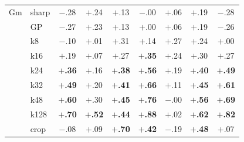 \begin{tabular}{llccccccc}
\midrule
Gm & sharp & $-$.28 & $+$.24 & $+$.13 & $-$.00 & $+$.06 & $+$.19 & $-$.28 \\
 & GP & $-$.27 & $+$.23 & $+$.13 & $+$.00 & $+$.06 & $+$.19 & $-$.26 \\
 & k8 & $-$.10 & $+$.01 & $+$.31 & $+$.14 & $+$.27 & $+$.24 & $+$.00 \\
 & k16 & $+$.19 & $+$.07 & $+$.27 & \textbf{$+$.35} & $+$.24 & $+$.30 & $+$.27 \\
 & k24 & \textbf{$+$.36} & $+$.16 & \textbf{$+$.38} & \textbf{$+$.56} & $+$.19 & \textbf{$+$.40} & \textbf{$+$.49} \\
 & k32 & \textbf{$+$.49} & $+$.20 & \textbf{$+$.41} & \textbf{$+$.66} & $+$.11 & \textbf{$+$.45} & \textbf{$+$.61} \\
 & k48 & \textbf{$+$.60} & $+$.30 & \textbf{$+$.45} & \textbf{$+$.76} & $-$.00 & \textbf{$+$.56} & \textbf{$+$.69} \\
 & k128 & \textbf{$+$.70} & \textbf{$+$.52} & \textbf{$+$.44} & \textbf{$+$.88} & $+$.02 & \textbf{$+$.62} & \textbf{$+$.82} \\
 & crop & $-$.08 & $+$.09 & \textbf{$+$.70} & \textbf{$+$.42} & $-$.19 & \textbf{$+$.48} & $+$.07 \\
\bottomrule
\end{tabular}
